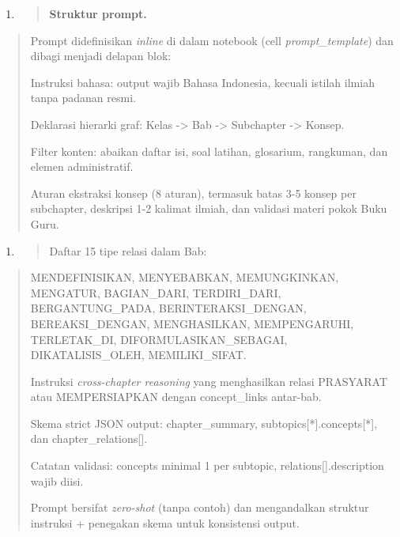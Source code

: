 \documentclass[
]{article}
\begin{document}
\begin{enumerate}
\def\labelenumi{\arabic{enumi}.}
\setcounter{enumi}{3}
\item
  \begin{quote}
  \textbf{Struktur prompt.}
  \end{quote}
\end{enumerate}

\begin{quote}
Prompt didefinisikan \emph{inline} di dalam notebook (cell
\emph{prompt\_template}) dan dibagi menjadi delapan blok:

Instruksi bahasa: output wajib Bahasa Indonesia, kecuali istilah ilmiah
tanpa padanan resmi.

Deklarasi hierarki graf: Kelas -\textgreater{} Bab -\textgreater{}
Subchapter -\textgreater{} Konsep.

Filter konten: abaikan daftar isi, soal latihan, glosarium, rangkuman,
dan elemen administratif.

Aturan ekstraksi konsep (8 aturan), termasuk batas 3-5 konsep per
subchapter, deskripsi 1-2 kalimat ilmiah, dan validasi materi pokok Buku
Guru.
\end{quote}

\begin{enumerate}
\def\labelenumi{\arabic{enumi}.}
\setcounter{enumi}{4}
\item
  \begin{quote}
  Daftar 15 tipe relasi dalam Bab:
  \end{quote}
\end{enumerate}

\begin{quote}
MENDEFINISIKAN, MENYEBABKAN, MEMUNGKINKAN, MENGATUR, BAGIAN\_DARI,
TERDIRI\_DARI, BERGANTUNG\_PADA, BERINTERAKSI\_DENGAN, BEREAKSI\_DENGAN,
MENGHASILKAN, MEMPENGARUHI, TERLETAK\_DI, DIFORMULASIKAN\_SEBAGAI,
DIKATALISIS\_OLEH, MEMILIKI\_SIFAT.

Instruksi \emph{cross-chapter reasoning} yang menghasilkan relasi
PRASYARAT atau MEMPERSIAPKAN dengan concept\_links antar-bab.

Skema strict JSON output: chapter\_summary,
subtopics{[}*{]}.concepts{[}*{]}, dan chapter\_relations{[}{]}.

Catatan validasi: concepts minimal 1 per subtopic,
relations{[}{]}.description wajib diisi.

Prompt bersifat \emph{zero-shot} (tanpa contoh) dan mengandalkan
struktur instruksi + penegakan skema untuk konsistensi output.
\end{quote}
\end{document}
